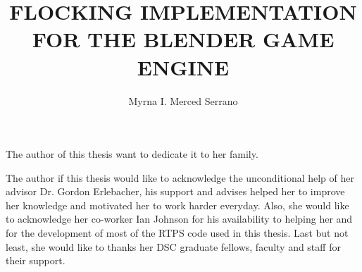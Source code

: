 \documentclass[11pt]{fsuthesis}
\title{FLOCKING IMPLEMENTATION FOR THE BLENDER GAME ENGINE}
\author{Myrna I. Merced Serrano}
\begin{document}
\frontmatter
\maketitle
\makesignaturepage

\begin{dedication}
The author of this thesis want to dedicate it to her family.
\end{dedication}

\begin{acknowledgments}
The author if this thesis would like to acknowledge the unconditional help of her advisor Dr. Gordon Erlebacher, his support and advises helped her to improve her knowledge and motivated her to work harder everyday. Also, she would like to acknowledge her co-worker Ian Johnson for his availability to helping her and for the development of most of the RTPS code used in this thesis. Last but not least, she would like to thanks her DSC graduate fellows, faculty and staff for their support.
\end{acknowledgments}

\tableofcontents



\begin{abstract}
\end{abstract}

\mainmatter

%

%


%

%
%

\begin{biosketch}
\end{biosketch}
\end{document}
